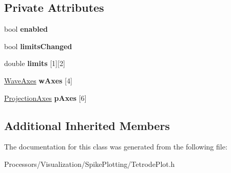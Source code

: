 \subsection*{Private Attributes}
\begin{DoxyCompactItemize}
\item 
\hypertarget{classTetrodePlot_a108da4895456bcab9f9a09830fe4488b}{bool {\bfseries enabled}}\label{classTetrodePlot_a108da4895456bcab9f9a09830fe4488b}

\item 
\hypertarget{classTetrodePlot_a8b19fe1a2fe811922ae72726eb2920fa}{bool {\bfseries limits\-Changed}}\label{classTetrodePlot_a8b19fe1a2fe811922ae72726eb2920fa}

\item 
\hypertarget{classTetrodePlot_a563321643780b4c28b5625dbc68a0cbb}{double {\bfseries limits} \mbox{[}1\mbox{]}\mbox{[}2\mbox{]}}\label{classTetrodePlot_a563321643780b4c28b5625dbc68a0cbb}

\item 
\hypertarget{classTetrodePlot_adccda029fea54263cadda8346c3d1777}{\hyperlink{classWaveAxes}{Wave\-Axes} {\bfseries w\-Axes} \mbox{[}4\mbox{]}}\label{classTetrodePlot_adccda029fea54263cadda8346c3d1777}

\item 
\hypertarget{classTetrodePlot_a29821ae3a96010d4c4db91ab44b59424}{\hyperlink{classProjectionAxes}{Projection\-Axes} {\bfseries p\-Axes} \mbox{[}6\mbox{]}}\label{classTetrodePlot_a29821ae3a96010d4c4db91ab44b59424}

\end{DoxyCompactItemize}
\subsection*{Additional Inherited Members}


The documentation for this class was generated from the following file\-:\begin{DoxyCompactItemize}
\item 
Processors/\-Visualization/\-Spike\-Plotting/Tetrode\-Plot.\-h\end{DoxyCompactItemize}
